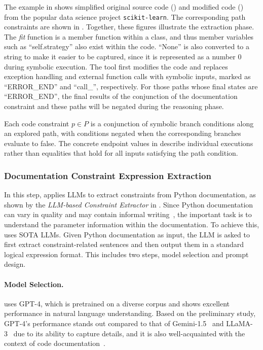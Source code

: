 The example in  shows simplified original source code () and modified code () from the popular data science project \texttt{scikit-learn}. The corresponding path constraints are shown in . Together, these figures illustrate the extraction phase. The \textit{fit} function is a member function within a class, and thus member variables such as ``self.strategy'' also exist within the code. ``None'' is also converted to a string to make it easier to be captured, since it is represented as a number 0 during symbolic execution. The tool first modifies the code and replaces exception handling and external function calls with symbolic inputs, marked as ``ERROR\_END'' and ``call\_'', respectively. For those paths whose final states are ``ERROR\_END'', the final results of the conjunction of the documentation constraint and these paths will be negated during the reasoning phase.


Each code constraint $p\in P$ is a conjunction of symbolic branch conditions along an explored path, with conditions negated when the corresponding branches evaluate to false. The concrete endpoint values in  describe individual executions rather than equalities that hold for all inputs satisfying the path condition.

\subsubsection{Documentation Constraint Expression Extraction}\label{sec:llm-mpchecker}

In this step, \toolchecker applies LLMs to extract constraints from Python documentation, as shown by the \textit{LLM-based Constraint Extractor} in . Since Python documentation can vary in quality and may contain informal writing~\cite{rani2021comments}, the important task is to understand the parameter information within the documentation. To achieve this, \toolchecker uses SOTA LLMs. Given Python documentation as input, the LLM is asked to first extract constraint-related sentences and then output them in a standard logical expression format. This includes two steps, model selection and prompt design.

\paragraph{Model Selection.} 
\toolchecker uses GPT-4, which is pretrained on a diverse corpus and shows
excellent performance in natural language understanding. Based on the preliminary study, GPT-4's
performance stands out compared to that of Gemini-1.5~\cite{gemini} and LLaMA-3~\cite{llama3} due to its
ability to capture details, and it is also well-acquainted with the context of code
documentation~\cite{dvivedi2024comparative}.


